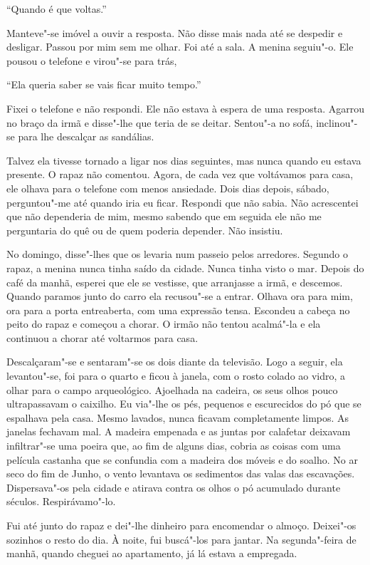 ``Quando é que voltas.''

Manteve"-se imóvel a ouvir a resposta. Não disse mais nada até se
despedir e desligar. Passou por mim sem me olhar. Foi até a sala. A
menina seguiu"-o. Ele pousou o telefone e virou"-se para trás,

``Ela queria saber se vais ficar muito tempo.''

Fixei o telefone e não respondi. Ele não estava à espera de uma
resposta. Agarrou no braço da irmã e disse"-lhe que teria de se deitar.
Sentou"-a no sofá, inclinou"-se para lhe descalçar as sandálias.

Talvez ela tivesse tornado a ligar nos dias seguintes, mas nunca quando
eu estava presente. O rapaz não comentou. Agora, de cada vez que
voltávamos para casa, ele olhava para o telefone com menos ansiedade.
Dois dias depois, sábado, perguntou"-me até quando iria eu ficar.
Respondi que não sabia. Não acrescentei que não dependeria de mim, mesmo
sabendo que em seguida ele não me perguntaria do quê ou de quem poderia
depender. Não insistiu.

No domingo, disse"-lhes que os levaria num passeio pelos arredores.
Segundo o rapaz, a menina nunca tinha saído da cidade. Nunca tinha visto
o mar. Depois do café da manhã, esperei que ele se vestisse, que
arranjasse a irmã, e descemos. Quando paramos junto do carro ela
recusou"-se a entrar. Olhava ora para mim, ora para a porta entreaberta,
com uma expressão tensa. Escondeu a cabeça no peito do rapaz e começou a
chorar. O irmão não tentou acalmá"-la e ela continuou a chorar até
voltarmos para casa.

Descalçaram"-se e sentaram"-se os dois diante da televisão. Logo a
seguir, ela levantou"-se, foi para o quarto e ficou à janela, com o
rosto colado ao vidro, a olhar para o campo arqueológico. Ajoelhada na
cadeira, os seus olhos pouco ultrapassavam o caixilho. Eu via"-lhe os
pés, pequenos e escurecidos do pó que se espalhava pela casa. Mesmo
lavados, nunca ficavam completamente limpos. As janelas fechavam mal. A
madeira empenada e as juntas por calafetar deixavam infiltrar"-se uma
poeira que, ao fim de alguns dias, cobria as coisas com uma película
castanha que se confundia com a madeira dos móveis e do soalho. No ar
seco do fim de Junho, o vento levantava os sedimentos das valas das
escavações. Dispersava"-os pela cidade e atirava contra os olhos o pó
acumulado durante séculos. Respirávamo"-lo.

Fui até junto do rapaz e dei"-lhe dinheiro para encomendar o almoço.
Deixei"-os sozinhos o resto do dia. À noite, fui buscá"-los para jantar.
Na segunda"-feira de manhã, quando cheguei ao apartamento, já lá estava
a empregada.

